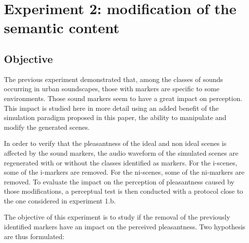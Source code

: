 \documentclass[preprint,12pt]{elsarticle}
\begin{document}
\section{Experiment 2: modification of the semantic content}
\label{sec:modification}

\subsection{Objective}


The previous experiment demonstrated that, among the classes of sounds occurring in urban soundscapes, those with markers are specific to some environments. Those sound markers seem to have a great impact on perception. This impact is studied here in more detail using an added benefit of the simulation paradigm proposed in this paper, the ability to manipulate and modify the generated scenes.


In order to verify that the pleasantness of the ideal and non ideal scenes is affected by the sound markers, the audio waveform of the simulated scenes are regenerated with or without the classes identified as markers. For the i-scenes, some of the i-markers are removed. For the ni-scenes, some of the ni-markers are removed. To evaluate the impact on the perception of pleasantness caused by those modifications, a perceptual test is then conducted with a protocol close to the one considered in experiment 1.b.


The objective of this experiment is to study if the removal of the previously identified markers have an impact on the perceived pleasantness. Two hypothesis are thus formulated:
\end{document}
